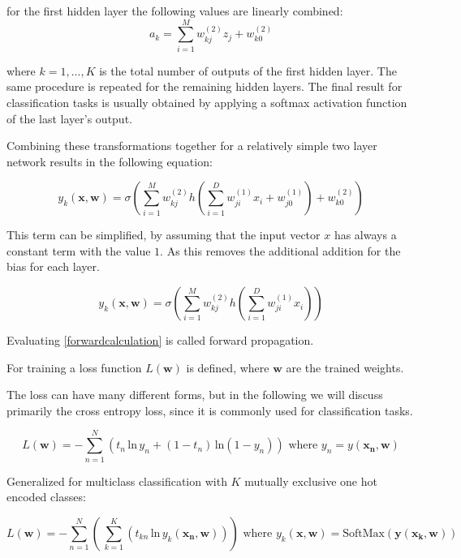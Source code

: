 \documentclass[draft,final,oneside]{vutinfth} %
\begin{document}
for the first hidden layer the following values are linearly combined:
\begin{equation}
a_k = \sum_{i=1}^{M} w_{kj}^{(2)}z_j + w_{k0}^{(2)}
\end{equation}

where $k = 1, ..., K$ is the total number of outputs of the first hidden layer. The same procedure is repeated for the remaining hidden layers. The final result for classification tasks is usually obtained by applying a softmax activation function of the last layer's output.

Combining these transformations together for a relatively simple two layer network results in the following equation:

\begin{equation}
y_k(\boldsymbol{x}, \boldsymbol{w}) = \sigma\left(\sum_{i=1}^{M} w_{kj}^{(2)}h\left(\sum_{i=1}^{D} w_{ji}^{(1)}x_i + w_{j0}^{(1)}\right) + w_{k0}^{(2)}\right)
\end{equation}

This term can be simplified, by assuming that the input vector $x$ has always a constant term with the value $1$. As this removes the additional addition for the bias for each layer.

\begin{equation} \label{forwardcalculation}
y_k(\boldsymbol{x}, \boldsymbol{w}) = \sigma\left(\sum_{i=1}^{M} w_{kj}^{(2)}h\left(\sum_{i=1}^{D} w_{ji}^{(1)}x_i\right)\right)
\end{equation}

Evaluating \ref{forwardcalculation} is called forward propagation.

For training a loss function $L(\boldsymbol{w})$ is defined, where $\boldsymbol{w}$ are the trained weights.

The loss can have many different forms, but in the following we will discuss primarily the cross entropy loss, since it is commonly used for classification tasks.

\begin{equation}
L(\boldsymbol{w}) = -\sum_{n=1}^N \left( t_n\,\text{ln}\, y_n + (1 - t_n)\,\text{ln}(1 - y_n)\right) \text{ where } 
y_n = y(\boldsymbol{x_n}, \boldsymbol{w})
\end{equation}

Generalized for multiclass classification with $K$ mutually exclusive one hot encoded classes:

\begin{equation}
L(\boldsymbol{w}) = -\sum_{n=1}^N \left(\,\sum_{k=1}^K \left(t_{kn}\,\text{ln}\,y_k(\boldsymbol{x_n},\boldsymbol{w})\right)\right) \text{ where } y_k(\boldsymbol{x}, \boldsymbol{w}) = \text{SoftMax}(\boldsymbol{y}(\boldsymbol{x_k}, \boldsymbol{w}))
\end{equation}
\end{document}
